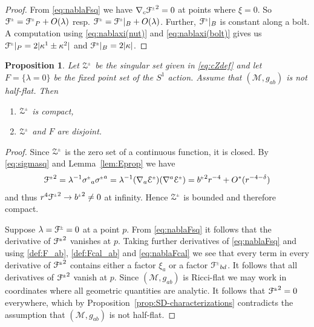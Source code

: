 \documentclass[a4paper,11pt,reqno]{amsart}
\newcommand{\nut}{P}
\newcommand{\bolt}{B}
\newcommand{\cE}{\mathcal{E}}
\newcommand{\cZ}{\mathcal{Z}}
\newcommand{\cM}{\mathcal{M}}
\newcommand{\cF}{\mathcal{F}}
\theoremstyle{plain}
\newtheorem{prop}[thm]{Proposition}
\newcommand{\PM}[1]{{{#1}^{\hspace{-.5pt}\scaleto{\pm}{3.5pt}}}}
\def\Fcal{\mathcal{F}}
\numberwithin{equation}{section}
\newcommand{\Fixed}{F}
\begin{document}
\begin{proof} 
From \eqref{eq:nablaFsq} we have $\nabla_{c}\PM{\Fcal}^2 = 0$ at points where $\xi=0$. So $\PM{\Fcal} = \PM{\Fcal}_\nut + O(\lambda)$ resp. $\PM{\Fcal} = \PM{\Fcal}|_\bolt + O(\lambda)$. Further, $\PM{\Fcal}|_\bolt$ is constant along a bolt. A computation using \eqref{eq:nablaxi(nut)} and \eqref{eq:nablaxi(bolt)} gives us $\PM{\Fcal}|_\nut = 2|\kappa^1 \pm \kappa^2|$ and $\PM{\Fcal}|_\bolt = 2|\kappa|$.
\end{proof}

\begin{prop} \label{prop:cZ-properties}
Let $\PM{\cZ}$ be the singular set given in \eqref{eq:cZdef} and let $\Fixed = \{ \lambda = 0 \}$ be the fixed point set of the $S^1$ action.  Assume that $(\cM, g_{ab})$ is not half-flat. Then
\begin{enumerate}
\item $\PM{\cZ}$ is compact,
\item $\PM{\cZ}$ and $\Fixed$ are disjoint.
\end{enumerate}
\end{prop}

\begin{proof}
Since $\PM{\cZ}$ is the zero set of a continuous function, it is closed. By \eqref{eq:sigmasq} and Lemma~\ref{lem:Eprop} we have
\begin{align} \label{Fcalasymp}
\PM{\Fcal}^2
= \lambda^{-1} \PM{\sigma}_{a} \PM{\sigma}^{a}
= \lambda^{-1}(\nabla_a\PM{\cE})(\nabla^a\PM{\cE})
=\PM{b}^2 r^{-4} + O^*(r^{-4-\delta})
\end{align}
and thus $r^4 \PM{\Fcal}^2 \to \PM{b}^2 \neq 0$ at infinity. Hence $\PM{\cZ}$ is bounded and therefore compact.

Suppose $\lambda = \PM{\Fcal} = 0$ at a point $p$. From \eqref{eq:nablaFsq} it follows that the derivative of $\PM{\Fcal}^2$ vanishes at $p$. Taking further derivatives of \eqref{eq:nablaFsq} and using \eqref{def:F_ab}, \eqref{def:Fcal_ab} and \eqref{eq:nablaFcal} we see that every term in every derivative of $\PM{\Fcal}^2$ contains either a factor $\xi_a$ or a factor $\PM\cF_{bd}$. It follows that all derivatives of $\PM{\Fcal}^2$ vanish at $p$. Since $(\cM, g_{ab})$ is Ricci-flat we may work in coordinates where all geometric quantities are analytic. It follows that $\PM{\Fcal}^2 = 0$ everywhere, which by Proposition~\ref{prop:SD-characterizations} contradicts the assumption that $(\cM, g_{ab})$ is not half-flat.
\end{proof}
\end{document}
